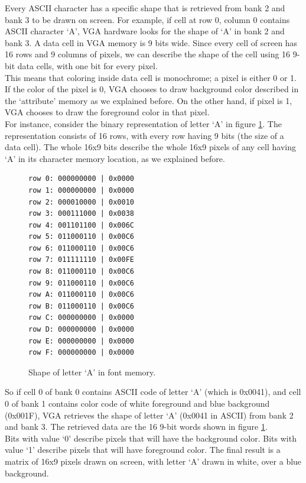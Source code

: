 \documentclass[oneside]{book}
\begin{document}
Every ASCII character has a specific shape that is retrieved from bank 2 and
bank 3 to be drawn on screen. For example, if cell at row 0, column 0 contains
ASCII character `A', VGA hardware looks for the shape of `A' in bank 2 and bank 3.
A data cell in VGA memory is 9 bits wide. Since every cell of screen has 16 rows
and 9 columns of pixels, we can describe the shape of the cell using 16 9-bit
data cells, with one bit for every pixel.\\

This means that coloring inside data cell is monochrome; a pixel is either 0
or 1. If the color of the pixel is 0, VGA chooses to draw background color
described in the `attribute' memory as we explained before. On the other hand,
if pixel is 1, VGA chooses to draw the foreground color in that pixel.\\

For instance, consider the binary representation of letter `A' in figure
\ref{shape_a}. The representation consists of 16 rows, with every row having
9 bits (the size of a data cell). The whole 16x9 bits describe the whole
16x9 pixels of any cell having `A' in its character memory location,
as we explained before.

\begin{figure}[H]
\begin{center}
\color{black!50!blue!80}
\bfseries
\begin{BVerbatim}[showspaces=false,fontsize=\small]
row 0: 000000000 | 0x0000
row 1: 000000000 | 0x0000
row 2: 000010000 | 0x0010
row 3: 000111000 | 0x0038
row 4: 001101100 | 0x006C
row 5: 011000110 | 0x00C6
row 6: 011000110 | 0x00C6
row 7: 011111110 | 0x00FE
row 8: 011000110 | 0x00C6
row 9: 011000110 | 0x00C6
row A: 011000110 | 0x00C6
row B: 011000110 | 0x00C6
row C: 000000000 | 0x0000
row D: 000000000 | 0x0000
row E: 000000000 | 0x0000
row F: 000000000 | 0x0000
\end{BVerbatim}
\end{center}
\caption{Shape of letter `A' in font memory.}
\label{shape_a}
\end{figure}

So if cell 0 of bank 0 contains ASCII code of letter `A' (which is 0x0041),
and cell 0 of bank 1 contains color code of white foreground and blue
background (0x001F), VGA retrieves the shape of letter `A' (0x0041 in ASCII)
from bank 2 and bank 3. The retrieved data are the 16 9-bit words shown
in figure \ref{shape_a}.\\

Bits with value `0' describe pixels that will have the background color. Bits
with value `1' describe pixels that will have foreground color. The final
result is a matrix of 16x9 pixels drawn on screen, with letter `A' drawn
in white, over a blue background.\\
\end{document}
